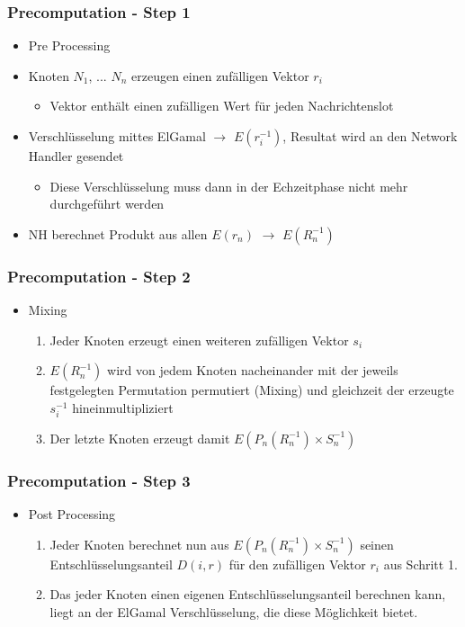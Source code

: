 \documentclass[t, xcolor=dvipsnames]{beamer}
\begin{document}
\begin{frame}
	\frametitle{Precomputation - Step 1}
	\begin{itemize}
				\item Pre Processing

				\item Knoten $N_1$, ... $N_n$ erzeugen einen zufälligen Vektor $r_i$
				\begin{itemize}
					\item Vektor enthält einen zufälligen Wert für jeden Nachrichtenslot
				\end{itemize}
				\item Verschlüsselung mittes ElGamal $\rightarrow$ $E(r_i^{-1})$, Resultat wird an den Network Handler gesendet
				\begin{itemize}
					\item Diese Verschlüsselung muss dann in der Echzeitphase nicht mehr durchgeführt werden
				\end{itemize}
				\item NH berechnet Produkt aus allen $E(r_n)$ $\rightarrow$ $E(R_n^{-1})$  
		\end{itemize}
	\vspace{\fill}
\end{frame}

\begin{frame}
	\frametitle{Precomputation - Step 2}
	\begin{itemize}
				\item Mixing
				\begin{enumerate}
					\item Jeder Knoten erzeugt einen weiteren zufälligen Vektor $s_i$
					\item $E(R_n^{-1})$ wird von jedem Knoten nacheinander mit der jeweils festgelegten Permutation permutiert (Mixing) und gleichzeit der erzeugte $s_i^{-1}$ hineinmultipliziert
				\item Der letzte Knoten erzeugt damit $E(P_n(R_n^{-1}) \times S_n^{-1})$
				\end{enumerate}

	\end{itemize}
	\vspace{\fill}
\end{frame}

\begin{frame}
	\frametitle{Precomputation - Step 3}
	\begin{itemize}
		\item Post Processing
		\begin{enumerate}
			\item Jeder Knoten berechnet nun aus $E(P_n(R_n^{-1}) \times S_n^{-1})$ seinen Entschlüsselungsanteil $D(i, r)$ für den zufälligen Vektor $r_i$ aus Schritt 1.
			\item Das jeder Knoten einen eigenen Entschlüsselungsanteil berechnen kann, liegt an der ElGamal Verschlüsselung, die diese Möglichkeit bietet.
		\end{enumerate}
		
	
	\end{itemize}
	\vspace{\fill}
\end{frame}
\end{document}
